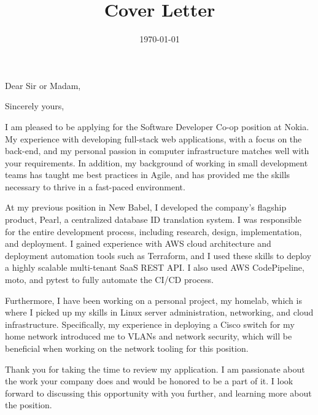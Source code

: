 \documentclass[11pt, letterpaper, sans]{moderncv}
\title{Cover Letter}
\begin{document}
\clearpage

\newcommand{\positionname}{Software Developer Co-op} %
\newcommand{\companyname}{Nokia} %

\recipient{HR Department}{\companyname{}} %
\date{\today} %
\opening{Dear Sir or Madam,} %
\closing{Sincerely yours,} %

\makelettertitle %

I am pleased to be applying for the \positionname{} position at \companyname{}.
My experience with developing full-stack web applications,
with a focus on the back-end,
and my personal passion in computer infrastructure matches well with your requirements.
In addition, my background of working in small development teams
has taught me best practices in Agile,
and has provided me the skills necessary to thrive in a fast-paced environment.

At my previous position in New Babel,
I developed the company's flagship product, Pearl, a centralized database ID translation system.
I was responsible for the entire development process,
including research, design, implementation, and deployment.
I gained experience with AWS cloud architecture
and deployment automation tools such as Terraform,
and I used these skills to deploy a highly scalable multi-tenant SaaS REST API.
I also used AWS CodePipeline, moto, and pytest to fully automate the CI/CD process.

Furthermore, I have been working on a personal project, my homelab,
which is where I picked up my skills in Linux server administration,
networking, and cloud infrastructure.
Specifically, my experience in deploying a Cisco switch for my home network
introduced me to VLANs and network security,
which will be beneficial when working on the network tooling for this position.

Thank you for taking the time to review my application.
I am passionate about the work your company does and would be honored to be a part of it.
I look forward to discussing this opportunity with you further,
and learning more about the position.

\makeletterclosing %

\newpage
\end{document}
